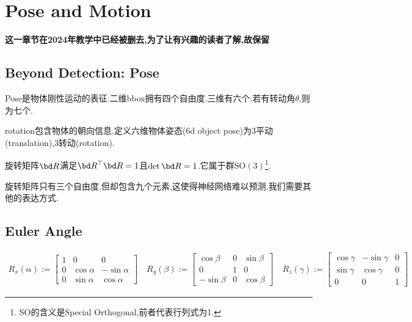 \section{Pose and Motion}

\textbf{这一章节在2024年教学中已经被删去,为了让有兴趣的读者了解,故保留}

\subsection{Beyond Detection: Pose}

Pose是物体刚性运动的表征.二维bbox拥有四个自由度.三维有六个.若有转动角$\theta$,则为七个.

rotation包含物体的朝向信息.定义六维物体姿态(6d object pose)为3平动(translation),3转动(rotation).

旋转矩阵$\bd R$满足$\bd R^\top\bd R = 1$且$\det \bd R = 1$.它属于群$\mathrm{SO(3)}$\footnote{SO的含义是Special Orthogonal,前者代表行列式为1.}.

旋转矩阵只有三个自由度,但却包含九个元素,这使得神经网络难以预测.我们需要其他的表达方式.

\subsection{Euler Angle}
\begin{equation}
    \begin{array}{l}
        R_{x}(\alpha):=\left[\begin{array}{ccc}
            1 & 0 & 0 \\
            0 & \cos \alpha & -\sin \alpha \\
            0 & \sin \alpha & \cos \alpha
        \end{array}\right] \quad
        R_{y}(\beta):=\left[\begin{array}{ccc}
            \cos \beta & 0 & \sin \beta \\
            0 & 1 & 0 \\
            -\sin \beta & 0 & \cos \beta
        \end{array}\right] \quad
        R_{z}(\gamma):=\left[\begin{array}{ccc}
            \cos \gamma & -\sin \gamma & 0 \\
            \sin \gamma & \cos \gamma & 0 \\
            0 & 0 & 1
        \end{array}\right]
    \end{array}
\end{equation}

